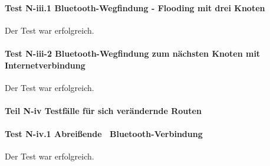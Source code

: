 \paragraph{Test N-iii.1 Bluetooth-Wegfindung - Flooding mit drei Knoten}

Der Test war erfolgreich.



\paragraph{Test N-iii-2 Bluetooth-Wegfindung zum nächsten Knoten mit Internetverbindung}

Der Test war erfolgreich.




\paragraph{Teil N-iv Testfälle für sich verändernde Routen}

\paragraph{Test N-iv.1 \glqq Abreißende\grqq~ Bluetooth-Verbindung}

Der Test war erfolgreich.




